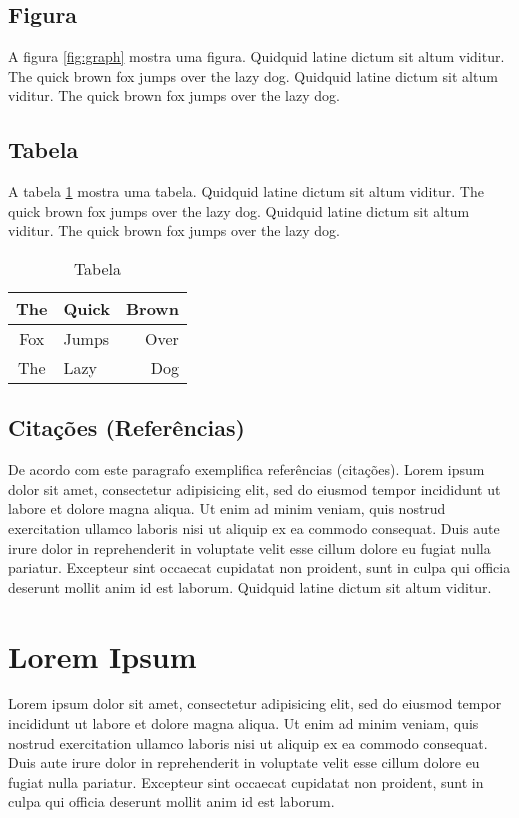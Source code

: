 \documentclass[12pt,a4paper]{article}
\begin{document}
\subsection{Figura}

A figura \ref{fig:graph} mostra uma figura. Quidquid latine dictum sit altum
viditur. The quick brown fox jumps over the lazy dog. Quidquid latine dictum
sit altum viditur. The quick brown fox jumps over the lazy dog.



\subsection{Tabela}

A tabela \ref{tab:tabela} mostra uma tabela. Quidquid latine dictum sit altum
viditur. The quick brown fox jumps over the lazy dog. Quidquid latine dictum
sit altum viditur. The quick brown fox jumps over the lazy dog.

\begin{table}[htbp]
	\caption{Tabela}
	\label{tab:tabela}
	\centering
	\begin{tabular}{|c|l|r|}
		\hline
		The 	&	Quick 	&	Brown	\\
		\hline
		Fox	&	Jumps	&	Over	\\
		The	&	Lazy	&	Dog	\\
		\hline 
	\end{tabular}
\end{table} 


\subsection{Citações (Referências)}

De acordo com \cite{DEAD:1666,BEEF:1234} este paragrafo exemplifica referências
(citações). Lorem ipsum dolor sit amet, consectetur adipisicing elit, sed do
eiusmod tempor incididunt ut labore et dolore magna aliqua. Ut enim ad minim
veniam, quis nostrud exercitation ullamco laboris nisi ut aliquip ex ea commodo
consequat. Duis aute irure dolor in reprehenderit in voluptate velit esse
cillum dolore eu fugiat nulla pariatur. Excepteur sint occaecat cupidatat non
proident, sunt in culpa qui officia deserunt mollit anim id est laborum.
Quidquid latine dictum sit altum viditur.


\section{Lorem Ipsum}

Lorem ipsum dolor sit amet, consectetur adipisicing elit, sed do eiusmod tempor
incididunt ut labore et dolore magna aliqua. Ut enim ad minim veniam, quis
nostrud exercitation ullamco laboris nisi ut aliquip ex ea commodo consequat.
Duis aute irure dolor in reprehenderit in voluptate velit esse cillum dolore eu
fugiat nulla pariatur. Excepteur sint occaecat cupidatat non proident, sunt in
culpa qui officia deserunt mollit anim id est laborum.


%
%


\end{document}
